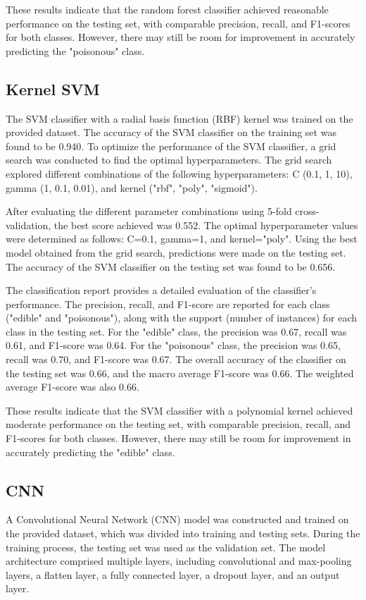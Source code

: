 \documentclass{article}
\begin{document}
These results indicate that the random forest classifier achieved reasonable performance on the testing set, with comparable precision, recall, and F1-scores for both classes. However, there may still be room for improvement in accurately predicting the "poisonous" class.

\subsection{Kernel SVM}
The SVM classifier with a radial basis function (RBF) kernel was trained on the provided dataset. The accuracy of the SVM classifier on the training set was found to be 0.940. To optimize the performance of the SVM classifier, a grid search was conducted to find the optimal hyperparameters. The grid search explored different combinations of the following hyperparameters: C (0.1, 1, 10), gamma (1, 0.1, 0.01), and kernel ("rbf", "poly", "sigmoid").

After evaluating the different parameter combinations using 5-fold cross-validation, the best score achieved was 0.552. The optimal hyperparameter values were determined as follows: C=0.1, gamma=1, and kernel="poly". Using the best model obtained from the grid search, predictions were made on the testing set. The accuracy of the SVM classifier on the testing set was found to be 0.656.

The classification report provides a detailed evaluation of the classifier's performance. The precision, recall, and F1-score are reported for each class ("edible" and "poisonous"), along with the support (number of instances) for each class in the testing set. For the "edible" class, the precision was 0.67, recall was 0.61, and F1-score was 0.64. For the "poisonous" class, the precision was 0.65, recall was 0.70, and F1-score was 0.67. The overall accuracy of the classifier on the testing set was 0.66, and the macro average F1-score was 0.66. The weighted average F1-score was also 0.66.

These results indicate that the SVM classifier with a polynomial kernel achieved moderate performance on the testing set, with comparable precision, recall, and F1-scores for both classes. However, there may still be room for improvement in accurately predicting the "edible" class.

\subsection{CNN}
A Convolutional Neural Network (CNN) model was constructed and trained on the provided dataset, which was divided into training and testing sets. During the training process, the testing set was used as the validation set. The model architecture comprised multiple layers, including convolutional and max-pooling layers, a flatten layer, a fully connected layer, a dropout layer, and an output layer.
\end{document}

